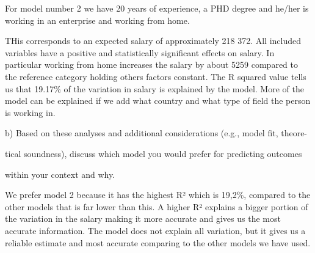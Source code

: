 \documentclass[
  letterpaper,
  DIV=11,
  numbers=noendperiod]{scrartcl}
\begin{document}
For model number 2 we have 20 years of experience, a PHD degree and
he/her is working in an enterprise and working from home.

THis corresponds to an expected salary of approximately 218 372. All
included variables have a positive and statistically significant effects
on salary. In particular working from home increases the salary by about
5259 compared to the reference category holding others factors constant.
The R squared value tells us that 19.17\% of the variation in salary is
explained by the model. More of the model can be explained if we add
what country and what type of field the person is working in.

b) Based on these analyses and additional considerations (e.g., model
fit, theore-

tical soundness), discuss which model you would prefer for predicting
outcomes

within your context and why.

We prefer model 2 because it has the highest R² which is 19,2\%,
compared to the other models that is far lower than this. A higher R²
explains a bigger portion of the variation in the salary making it more
accurate and gives us the most accurate information. The model does not
explain all variation, but it gives us a reliable estimate and most
accurate comparing to the other models we have used.
\end{document}

